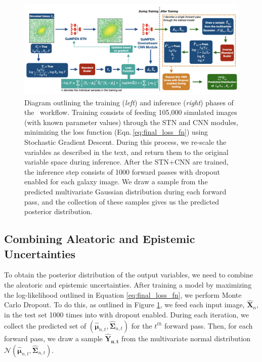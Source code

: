 \begin{figure}[htb]
    \centering
    \includegraphics[width
    =\textwidth]{workflow_gampen.png}
    \caption{Diagram outlining the training (\textit{left}) and inference (\textit{right}) phases of the \gampen\ workflow. Training consists of feeding 105,000 simulated images (with known parameter values) through the STN and CNN modules, minimizing the loss function (Eqn.\,\ref{eq:final_loss_fn}) using Stochastic Gradient Descent. 
    During this process, we re-scale the variables as described in the text, and return them to the original variable space during inference.
    After the STN+CNN are trained, the inference step consists of 1000 forward passes with dropout enabled for each galaxy image. We draw a sample from the predicted multivariate Gaussian distribution during each forward pass, and the collection of these samples gives us the predicted posterior distribution.}
    \label{fig_c2:workflow}
\end{figure}

\subsection{Combining Aleatoric and Epistemic Uncertainties}
\label{subsec_c2:combining_uncertainties}
To obtain the posterior distribution of the output variables, we need to combine the aleatoric and epistemic uncertainties. After training a model by maximizing the log-likelihood outlined in Equation \ref{eq:final_loss_fn}, we perform Monte Carlo Dropout. To do this, as outlined in Figure \ref{fig_c2:workflow}, we feed each input image, $\boldsymbol{\hat{X}}_n$, in the test set 1000 times into \gampen{} with dropout enabled. During each iteration, we collect the predicted set of $\left(\hat{\boldsymbol{\mu}}_{n,t},\boldsymbol{\hat{\Sigma}}_{n,t}\right)$ for the $t^{th}$ forward pass. Then, for each forward pass, we draw a sample $\boldsymbol{\hat{Y}_{n,t}}$ from the multivariate normal distribution $\mathcal{N}\left(\boldsymbol{\hat{\mu}}_{n,t},\boldsymbol{\hat{\Sigma}}_{n,t}\right)$. 

